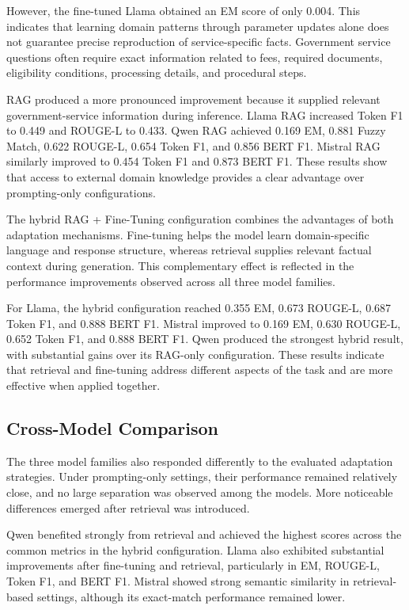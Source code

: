 \documentclass[10pt,journal,compsoc]{IEEEtran}
\begin{document}
However, the fine-tuned Llama obtained an EM score of only 0.004. This
indicates that learning domain patterns through parameter updates alone does
not guarantee precise reproduction of service-specific facts. Government
service questions often require exact information related to fees, required
documents, eligibility conditions, processing details, and procedural steps.

RAG produced a more pronounced improvement because it supplied relevant
government-service information during inference. Llama RAG increased Token
F1 to 0.449 and ROUGE-L to 0.433. Qwen RAG achieved 0.169 EM, 0.881
Fuzzy Match, 0.622 ROUGE-L, 0.654 Token F1, and 0.856 BERT F1. Mistral
RAG similarly improved to 0.454 Token F1 and 0.873 BERT F1. These results
show that access to external domain knowledge provides a clear advantage
over prompting-only configurations.

The hybrid RAG + Fine-Tuning configuration combines the advantages of both
adaptation mechanisms. Fine-tuning helps the model learn domain-specific
language and response structure, whereas retrieval supplies relevant factual
context during generation. This complementary effect is reflected in the
performance improvements observed across all three model families.

For Llama, the hybrid configuration reached 0.355 EM, 0.673 ROUGE-L,
0.687 Token F1, and 0.888 BERT F1. Mistral improved to 0.169 EM,
0.630 ROUGE-L, 0.652 Token F1, and 0.888 BERT F1. Qwen produced the
strongest hybrid result, with substantial gains over its RAG-only
configuration. These results indicate that retrieval and fine-tuning address
different aspects of the task and are more effective when applied together.

\subsection{Cross-Model Comparison}

The three model families also responded differently to the evaluated
adaptation strategies. Under prompting-only settings, their performance
remained relatively close, and no large separation was observed among the
models. More noticeable differences emerged after retrieval was introduced.

Qwen benefited strongly from retrieval and achieved the highest scores across
the common metrics in the hybrid configuration. Llama also exhibited
substantial improvements after fine-tuning and retrieval, particularly in EM,
ROUGE-L, Token F1, and BERT F1. Mistral showed strong semantic similarity in
retrieval-based settings, although its exact-match performance remained
lower.
\end{document}
